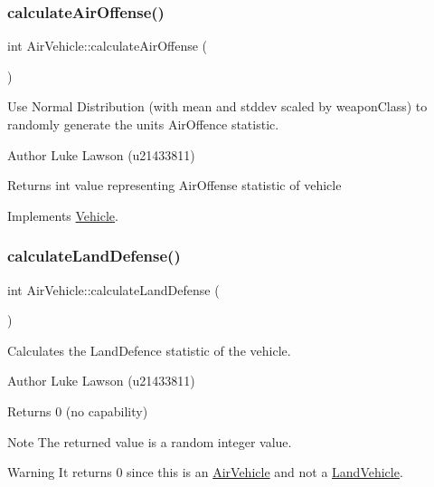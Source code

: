 \mbox{\label{class_air_vehicle_a1365cb66c2a8755e689f938c734df6c0}} 
\subsubsection{\texorpdfstring{calculateAirOffense()}{calculateAirOffense()}}
{\footnotesize\ttfamily int Air\+Vehicle\+::calculate\+Air\+Offense (\begin{DoxyParamCaption}{ }\end{DoxyParamCaption})\hspace{0.3cm}{\ttfamily [virtual]}}



Use Normal Distribution (with mean and stddev scaled by weapon\+Class) to randomly generate the unit\textquotesingle{}s Air\+Offence statistic. 

\begin{DoxyAuthor}{Author}
Luke Lawson (u21433811) 
\end{DoxyAuthor}
\begin{DoxyReturn}{Returns}
int value representing Air\+Offense statistic of vehicle 
\end{DoxyReturn}


Implements \mbox{\hyperlink{class_vehicle_a0a6c6ed9d25c66415f83191894b11499}{Vehicle}}.

\mbox{\label{class_air_vehicle_acb7d32241e484f1ece2123451f061168}} 
\subsubsection{\texorpdfstring{calculateLandDefense()}{calculateLandDefense()}}
{\footnotesize\ttfamily int Air\+Vehicle\+::calculate\+Land\+Defense (\begin{DoxyParamCaption}{ }\end{DoxyParamCaption})\hspace{0.3cm}{\ttfamily [virtual]}}



Calculates the Land\+Defence statistic of the vehicle. 

\begin{DoxyAuthor}{Author}
Luke Lawson (u21433811) 
\end{DoxyAuthor}
\begin{DoxyReturn}{Returns}
0 (no capability) 
\end{DoxyReturn}
\begin{DoxyNote}{Note}
The returned value is a random integer value. 
\end{DoxyNote}
\begin{DoxyWarning}{Warning}
It returns 0 since this is an \mbox{\hyperlink{class_air_vehicle}{Air\+Vehicle}} and not a \mbox{\hyperlink{class_land_vehicle}{Land\+Vehicle}}. 
\end{DoxyWarning}


